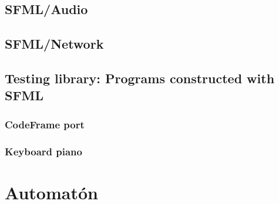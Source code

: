 \documentclass[latterpaper, leqno]{article}
\begin{document}
\subsection{SFML/Audio}
\subsection{SFML/Network}
\subsection{Testing library: Programs constructed with SFML}
\subsubsection*{CodeFrame port}
\subsubsection*{Keyboard piano}

\section{Automatón}
\end{document}
